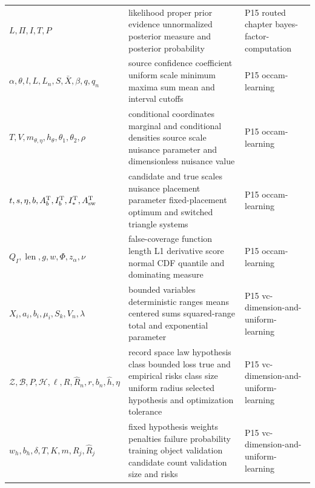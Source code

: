 \begin{longtable}{@{}p{}p{}p{}@{}}
\(L,\allowbreak \Pi,\allowbreak I,\allowbreak T,\allowbreak P\) & likelihood proper prior evidence unnormalized posterior measure and posterior probability & P15 routed chapter bayes-\allowbreak{}factor-\allowbreak{}computation \\
\(\alpha,\allowbreak \theta,\allowbreak l,\allowbreak L,\allowbreak L_n,\allowbreak S,\allowbreak \bar X,\allowbreak \beta,\allowbreak q,\allowbreak q_n\) & source confidence coefficient uniform scale minimum maxima sum mean and interval cutoffs & P15 occam-\allowbreak{}learning \\
\(T,\allowbreak V,\allowbreak m_{\theta,\eta},\allowbreak h_\theta,\allowbreak \theta_1,\allowbreak \theta_2,\allowbreak \rho\) & conditional coordinates marginal and conditional densities source scale nuisance parameter and dimensionless nuisance value & P15 occam-\allowbreak{}learning \\
\(t,\allowbreak s,\allowbreak \eta,\allowbreak b,\allowbreak A_b^{\rm T},\allowbreak I_b^{\rm T},\allowbreak I_*^{\rm T},\allowbreak A_{\rm sw}^{\rm T}\) & candidate and true scales nuisance placement parameter fixed-placement optimum and switched triangle systems & P15 occam-\allowbreak{}learning \\
\(Q_I,\allowbreak \operatorname{len},\allowbreak g,\allowbreak w,\allowbreak \Phi,\allowbreak z_\alpha,\allowbreak \nu\) & false-coverage function length L1 derivative score normal CDF quantile and dominating measure & P15 occam-\allowbreak{}learning \\
\(X_i,\allowbreak a_i,\allowbreak b_i,\allowbreak \mu_i,\allowbreak S_k,\allowbreak V_n,\allowbreak \lambda\) & bounded variables deterministic ranges means centered sums squared-range total and exponential parameter & P15 vc-\allowbreak{}dimension-\allowbreak{}and-\allowbreak{}uniform-\allowbreak{}learning \\
\(\mathcal Z,\allowbreak \mathcal B,\allowbreak P,\allowbreak \mathcal H,\allowbreak \ell,\allowbreak R,\allowbreak \widehat R_n,\allowbreak r,\allowbreak b_n,\allowbreak \widehat h,\allowbreak \eta\) & record space law hypothesis class bounded loss true and empirical risks class size uniform radius selected hypothesis and optimization tolerance & P15 vc-\allowbreak{}dimension-\allowbreak{}and-\allowbreak{}uniform-\allowbreak{}learning \\
\(w_h,\allowbreak b_h,\allowbreak \delta,\allowbreak T,\allowbreak K,\allowbreak m,\allowbreak R_j,\allowbreak \widehat R_j\) & fixed hypothesis weights penalties failure probability training object validation candidate count validation size and risks & P15 vc-\allowbreak{}dimension-\allowbreak{}and-\allowbreak{}uniform-\allowbreak{}learning \\

\end{longtable}
